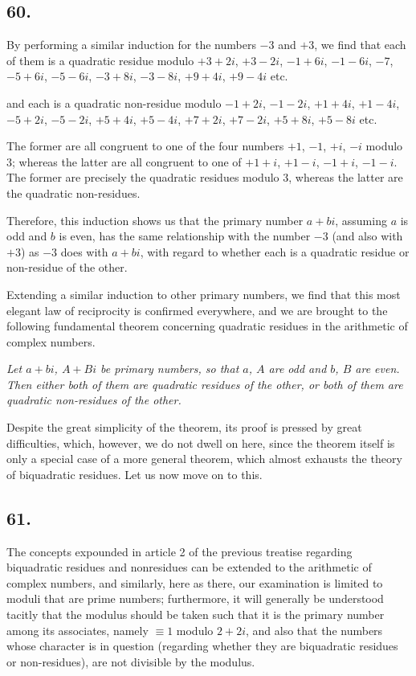 \documentclass[twoside,12pt]{memoir}
\begin{document}
\subsection*{60.}

By performing a similar induction for the numbers \(-3\) and \(+3\), we find that each of them is a quadratic residue modulo \(+3+2 i\), \(+3-2 i\), \(-1+6 i\), \(-1-6 i\), \(-7\), \(-5+6 i\), \(-5-6 i\), \(-3+8 i\), \(-3-8 i\), \(+9+4 i\), \(+9-4 i\) etc{.}

and each is a quadratic non-residue modulo \(-1+2 i\), \(-1-2 i\), \(+1+4 i\), \(+1-4 i\), \(-5+2 i\), \(-5-2 i\), \(+5+4 i\), \(+5-4 i\), \(+7+2 i\), \(+7-2 i\), \(+5+8 i\), \(+5-8 i\) etc{.}

The former are all congruent to one of the four numbers \(+1\), \(-1\), \(+i\), \(-i\) modulo \(3\); whereas the latter are all congruent to one of \(+1+i\), \(+1-i\), \(-1+i\), \(-1-i\). The former are precisely the quadratic residues modulo \(3\), whereas the latter are the quadratic non-residues.

Therefore, this induction shows us that the primary number \(a+b i\), assuming \(a\) is odd and \(b\) is even, has the same relationship with the number \(-3\) (and also with \(+3\)) as \(-3\) does with \(a+bi\), with regard to whether each is a quadratic residue or non-residue of the other.
%

Extending a similar induction to other primary numbers, we find that this most elegant law of reciprocity is confirmed everywhere, and we are brought to the following fundamental theorem concerning quadratic residues in the arithmetic of complex numbers. 
 
\textit{Let \(a+b i\), \(A+B i\) be primary numbers, so that \(a\), \(A\) are odd and \(b\), \(B\) are even.  Then either both of them are quadratic residues of the other, or both of them are quadratic non-residues of the other.} 
 
Despite the great simplicity of the theorem, its proof is pressed by great difficulties, which, however, we do not dwell on here, since the theorem itself is only a special case of a more general theorem, which almost exhausts the theory of biquadratic residues. Let us now move on to this.
%

\subsection*{61.}

The concepts expounded in article 2 of the previous treatise regarding biquadratic residues and nonresidues can be extended to the arithmetic of complex numbers, and similarly, here as there, our examination is limited to moduli that are prime numbers; furthermore, it will generally be understood tacitly that the modulus should be taken such that it is the primary number among its associates, namely \(\equiv 1\) modulo \(2+2i\), and also that the numbers whose character is in question (regarding whether they are biquadratic residues or non-residues), are not divisible by the modulus.
\end{document}

